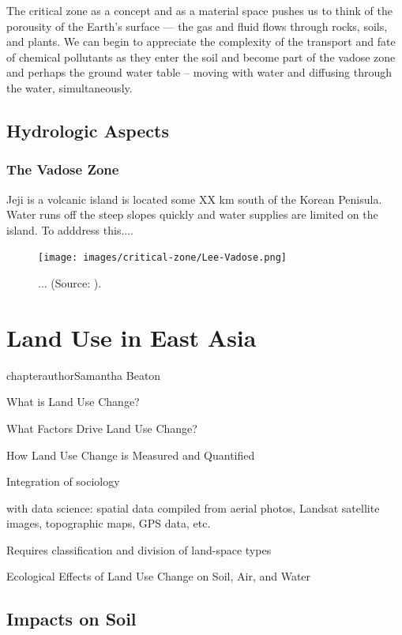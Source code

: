 \documentclass{book}\usepackage{knitr}
\begin{document}
The critical zone as a concept and as a material space pushes us to think of the porousity of the Earth's surface --- the gas and fluid flows through rocks, soils, and plants. We can begin to appreciate the complexity of the transport and fate of chemical pollutants as they enter the soil and become part of the vadose zone and perhaps the ground water table -- moving with water and diffusing through the water, simultaneously.

\section{Hydrologic Aspects}

\subsection{The Vadose Zone}

Jeji is a volcanic island is located some XX km south of the Korean Penisula. Water runs off the steep slopes quickly and water supplies are limited on the island. To adddress this...\citet{lee2017fifty}.

\begin{figure}
\texttt{[image: images/critical-zone/Lee-Vadose.png]}
\caption{... (Source: \citep{lee2017fifty}).}
\label{fig:vadose2}
\end{figure}



\chapter{Land Use in East Asia}

chapterauthor{Samantha Beaton}

What is Land Use Change?

What Factors Drive Land Use Change?

How Land Use Change is Measured and Quantified

Integration of sociology

with data science: spatial data compiled from aerial photos, Landsat satellite images, topographic maps, GPS data, etc.

Requires classification and division of land-space types

Ecological Effects of Land Use Change on Soil, Air, and Water

\section{Impacts on Soil}
\end{document}
